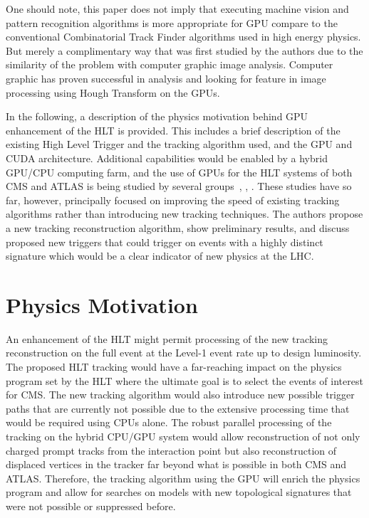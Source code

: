\documentclass{JINST}
\begin{document}
One should note, this paper does not imply that executing machine vision
and pattern recognition algorithms  is more appropriate for GPU compare to the
 conventional Combinatorial Track Finder algorithms used in high energy physics.
But merely a complimentary way that was first studied by the authors  due to the similarity of 
the problem with computer graphic image analysis. Computer graphic has proven 
successful in analysis and looking for feature in image processing using
Hough Transform on the GPUs.

In the following, a description of the physics motivation behind GPU enhancement of the HLT is provided.  This
includes a brief description of the existing High Level Trigger and the tracking algorithm used, and the GPU
and CUDA architecture.  Additional capabilities would be enabled by a hybrid GPU/CPU computing farm, and the
use of GPUs for the HLT systems of both CMS and ATLAS is being studied by several
groups~\cite{Emeliyanov:2012mg}, \cite{Mattmann:2012hi}, \cite{Clark:2011zzb}. These studies have so far,
however, principally focused on improving the speed of existing tracking algorithms rather than introducing
new tracking techniques.  The authors propose a new tracking reconstruction algorithm, show preliminary
results, and discuss proposed new triggers that could trigger on events with a highly distinct signature which
would be a clear indicator of new physics at the LHC.


\section{Physics Motivation}

An enhancement of the HLT might permit processing of the new tracking reconstruction on the full event 
at the Level-1 event rate up to design luminosity. The proposed HLT tracking would have a far-reaching impact on the physics program 
set by the HLT where the ultimate goal is to select the events of interest for CMS.
The new tracking algorithm would also introduce new possible trigger paths that are currently not possible due to the extensive
 processing time that would be required using CPUs alone. The robust parallel processing of the tracking on the 
hybrid CPU/GPU system would allow reconstruction of not only charged prompt tracks from the interaction point
but also reconstruction of displaced vertices in the tracker far beyond what is possible in both CMS and ATLAS.
Therefore, the tracking algorithm using the GPU will enrich the physics program and allow for searches on models
 with new topological signatures that were not possible or suppressed before.
\end{document}
